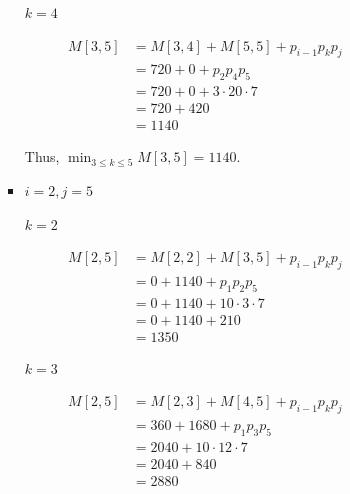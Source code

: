 \documentclass[12pt]{article}
\begin{document}
\begin{enumerate}[1.]
\begin{itemize}
\begin{itemize}
\begin{enumerate}[1.]
\begin{enumerate}[1)]
\begin{itemize}
                        \bigskip

                        \underline{$k = 4$}

                        \begin{align}
                            M[3,5] &= M[3,4] + M[5,5] + p_{i-1}p_kp_j\\
                            &= 720 + 0 + p_2p_4p_5\\
                            &= 720 + 0 + 3 \cdot 20 \cdot 7\\
                            &= 720 + 420\\
                            &= 1140
                        \end{align}

                        \bigskip

                        Thus, $\min_{3 \leq k \leq 5} M[3,5] = 1140$.


                        \item $i = 2, j = 5$

                        \bigskip

                        \underline{$k = 2$}

                        \begin{align}
                            M[2,5] &= M[2,2] + M[3,5] + p_{i-1}p_kp_j\\
                            &= 0 + 1140 + p_1p_2p_5\\
                            &= 0 + 1140 + 10 \cdot 3 \cdot 7\\
                            &= 0 + 1140 + 210\\
                            &= 1350
                        \end{align}

                        \bigskip

                        \underline{$k = 3$}

                        \begin{align}
                            M[2,5] &= M[2,3] + M[4,5] + p_{i-1}p_kp_j\\
                            &= 360 + 1680 + p_1p_3p_5\\
                            &= 2040 + 10 \cdot 12 \cdot 7\\
                            &= 2040 + 840\\
                            &= 2880
                        \end{align}


\end{itemize}
\end{enumerate}
\end{enumerate}
\end{itemize}
\end{itemize}
\end{enumerate}
\end{document}
